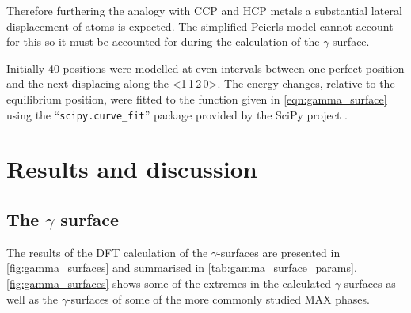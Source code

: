 Therefore furthering the analogy with CCP and HCP metals a substantial lateral displacement of atoms is expected. The simplified Peierls model cannot account for this so it must be accounted for during the calculation of the $\gamma$-surface.

Initially 40 positions were modelled at even intervals between one perfect position and the next displacing along the <1\,1\,\={2}\,0>. The energy changes, relative to the equilibrium position, were fitted to the function given in \autoref{eqn:gamma_surface} using the ``\texttt{scipy.curve\_fit}'' package provided by the SciPy project \cite{SciPy2001}.





\section{Results and discussion}

\subsection{The \texorpdfstring{$\gamma$}{gamma} surface}
The results of the DFT calculation of the $\gamma$-surfaces are presented in \autoref{fig:gamma_surfaces} and summarised in \autoref{tab:gamma_surface_params}. \autoref{fig:gamma_surfaces} shows some of the extremes in the calculated $\gamma$-surfaces as well as the $\gamma$-surfaces of some of the more commonly studied MAX phases. 


